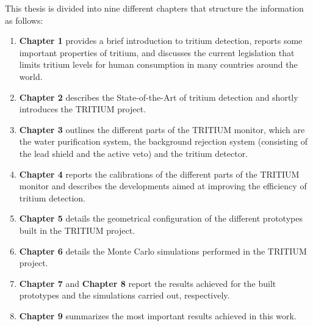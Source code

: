 This thesis is divided into nine different chapters that structure the information as follows:

\begin{enumerate}
\item{} \textbf{Chapter 1} provides a brief introduction to tritium detection, reports some important properties of tritium, and discusses the current legislation that limits tritium levels for human consumption in many countries around the world. 

\item{} \textbf{Chapter 2} describes the State-of-the-Art of tritium detection and shortly introduces the TRITIUM project. 

\item{} \textbf{Chapter 3} outlines the different parts of the TRITIUM monitor, which are the water purification system, the background rejection system (consisting of the lead shield and the active veto)  and the tritium detector. 

\item{} \textbf{Chapter 4} reports the calibrations of the different parts of the TRITIUM monitor and describes the developments aimed at improving the efficiency of tritium detection. 

\item{} \textbf{Chapter 5} details the geometrical configuration of the different prototypes built in the TRITIUM project. 

\item{} \textbf{Chapter 6} details the Monte Carlo simulations performed in the TRITIUM project. 

\item {} \textbf{Chapter 7} and \textbf{Chapter 8} report the results  achieved for the built prototypes and the simulations carried out, respectively. 

\item{} \textbf{Chapter 9} summarizes the most important results achieved in this work.

\end{enumerate}


